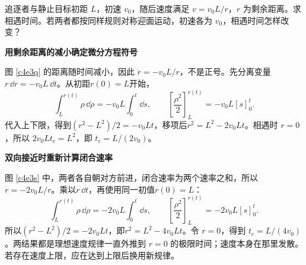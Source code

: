 \begin{question}
\begin{example}[速度与剩余距离成反比]
追逐者与静止目标初距 $L$，初速 $v_0$，随后速度满足 $v=v_0L/r$，$r$ 为剩余距离。求相遇时间。若两者都按同样规则对称迎面运动，初速各为 $v_0$，相遇时间怎样改变？
\end{example}
\end{question}
\begin{solution}\textbf{用剩余距离的减小确定微分方程符号}\par\nobreak
图 \ref{c4e3q} 的距离随时间减小，因此 $\dot r=-v_0L/r$，不是正号。先分离变量$r\,\dd r=-v_0L\,\dd t$。从初距$r(0)=L$开始，
\[
\int_L^{r(t)}\rho\,\dd\rho=-v_0L\int_0^t\dd s,
\qquad
\left[\frac{\rho^2}{2}\right]_L^{r(t)}=-v_0L[s]_0^t.
\]
代入上下限，得到$(r^2-L^2)/2=-v_0Lt$，移项后$r^2=L^2-2v_0Lt$。相遇时 $r=0$，所以 $2v_0Lt_c=L^2$，即 $t_c=L/(2v_0)$。


\par\medskip{}\noindent\textbf{双向接近时重新计算闭合速率}\par\nobreak
图 \ref{c4e3s} 中，两者各自朝对方前进，闭合速率为两个速率之和，所以 $\dot r=-2v_0L/r$。乘以$r\,\dd t$，再使用同一初值$r(0)=L$：
\[
\int_L^{r(t)}\rho\,\dd\rho=-2v_0L\int_0^t\dd s,
\qquad
\left[\frac{\rho^2}{2}\right]_L^{r(t)}=-2v_0L[s]_0^t.
\]
所以$(r^2-L^2)/2=-2v_0Lt$，即$r^2=L^2-4v_0Lt$。令 $r=0$，得到 $t_c=L/(4v_0)$。两结果都是理想速度规律一直外推到 $r=0$ 的极限时间；速度本身在那里发散。若存在速度上限，应在达到上限后换用新规律。
\end{solution}


